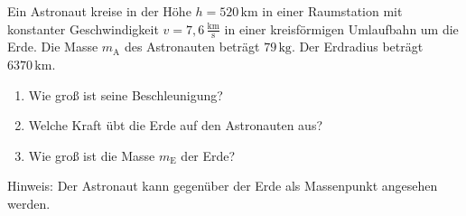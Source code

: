   \begin{MExercises}
  
  \begin{MExercise}
  Ein Astronaut kreise in der H\"ohe $h=520\,\text{km}$ in einer Raumstation mit konstanter Geschwindigkeit $v=7{,}6\,\frac{\text{km}}{\text{s}}$ in einer kreisf\"ormigen Umlaufbahn um die Erde. Die Masse $m_{\textrm{A}}$ des Astronauten betr\"agt $79\,\text{kg}$. Der Erdradius betr\"agt $6370\,\text{km}$. 
  \begin{enumerate}
  \item Wie gro{\ss} ist seine Beschleunigung?
  \item Welche Kraft \"ubt die Erde auf den Astronauten aus?
  \item Wie gro{\ss} ist die Masse $m_{\textrm{E}}$ der Erde?
  \end{enumerate}
  Hinweis: Der Astronaut kann gegen\"uber der Erde als Massenpunkt angesehen werden.
  

\end{MExercise}
\end{MExercises}
